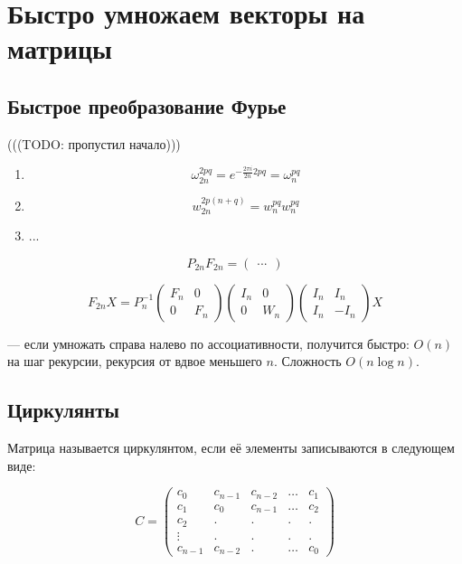 \section{Быстро умножаем векторы на матрицы}

\subsection{Быстрое преобразование Фурье}

(((TODO: пропустил начало)))

\begin{enumerate}
    \item
        \[
            \omega_{2n}^{2pq} = e^{-\frac{2\pi i}{2n} 2pq} = \omega_n^{pq}
        \]

    \item
        \[
            w_{2n}^{2p(n+q)} = w_n^{pq} w_n^{pq}
        \]

    \item ...
\end{enumerate}

\[
    P_{2n} F_{2n} = \begin{pmatrix}
        ...
    \end{pmatrix}
\]

\[
    F_{2 n} X = P_n^{-1} \begin{pmatrix} F_n & 0 \\ 0 & F_n \end{pmatrix}
    \begin{pmatrix} I_n & 0 \\ 0 & W_n \end{pmatrix}
    \begin{pmatrix} I_n & I_n \\ I_n & -I_n \end{pmatrix} X
\]

--- если умножать справа налево по ассоциативности, получится быстро: $O(n)$
на шаг рекурсии, рекурсия от вдвое меньшего $n$. Сложность $O(n \log n)$.

\subsection{Циркулянты}

\begin{definition}
    Матрица называется циркулянтом, если её элементы записываются в следующем
    виде:

    \[
        C = \begin{pmatrix}
            c_0 & c_{n - 1} & c_{n - 2} & \dots & c_1 \\
            c_1 & c_0 & c_{n - 1} & \dots & c_2 \\
            c_2 & . & . & . & . \\
            \vdots & . & . & . & . \\
            c_{n - 1} & c_{n - 2} & . & \dots & c_0
        \end{pmatrix}
    \]
\end{definition}

